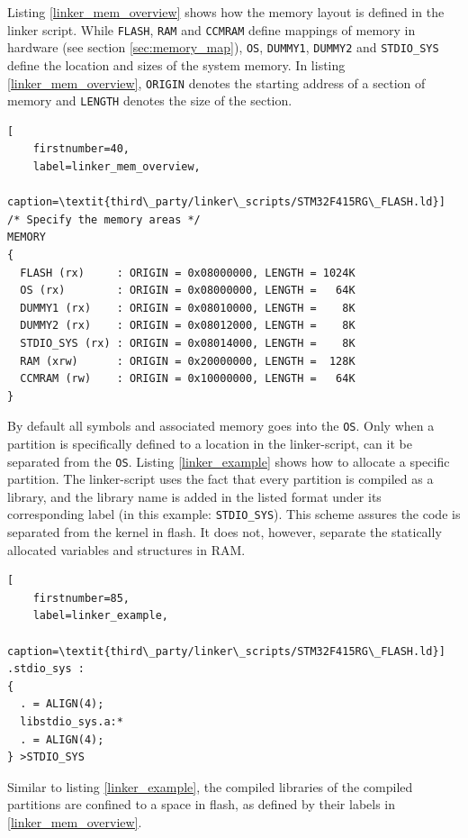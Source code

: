 Listing \ref{linker_mem_overview} shows how the memory layout is defined in the linker script.
While \texttt{FLASH}, \texttt{RAM} and \texttt{CCMRAM} define mappings of memory in hardware (see section \ref{sec:memory_map}),
\texttt{OS}, \texttt{DUMMY1}, \texttt{DUMMY2} and \texttt{STDIO\_SYS} define the location and sizes of the system memory.
In listing \ref{linker_mem_overview}, \texttt{ORIGIN} denotes the starting address of a section of memory
and \texttt{LENGTH} denotes the size of the section.\\

\begin{minipage}{\linewidth}
\begin{lstlisting}[
	firstnumber=40,
	label=linker_mem_overview,
	caption=\textit{third\_party/linker\_scripts/STM32F415RG\_FLASH.ld}]
/* Specify the memory areas */
MEMORY
{
  FLASH (rx)     : ORIGIN = 0x08000000, LENGTH = 1024K
  OS (rx)        : ORIGIN = 0x08000000, LENGTH =   64K
  DUMMY1 (rx)    : ORIGIN = 0x08010000, LENGTH =    8K
  DUMMY2 (rx)    : ORIGIN = 0x08012000, LENGTH =    8K
  STDIO_SYS (rx) : ORIGIN = 0x08014000, LENGTH =    8K
  RAM (xrw)      : ORIGIN = 0x20000000, LENGTH =  128K
  CCMRAM (rw)    : ORIGIN = 0x10000000, LENGTH =   64K
}
\end{lstlisting}
\end{minipage}

By default all symbols and associated memory goes into the \texttt{OS}.
Only when a partition is specifically defined to a location in the linker-script,
can it be separated from the \texttt{OS}.
Listing \ref{linker_example} shows how to allocate a specific partition.
The linker-script uses the fact that every partition is compiled as a library,
and the library name is added in the listed format under its corresponding label
(in this example: \texttt{STDIO\_SYS}).
This scheme assures the code is separated from the kernel in flash.
It does not, however, separate the statically allocated variables and structures in RAM.\\

\begin{minipage}{\linewidth}
\begin{lstlisting}[
	firstnumber=85,
	label=linker_example,
	caption=\textit{third\_party/linker\_scripts/STM32F415RG\_FLASH.ld}]
.stdio_sys :
{
  . = ALIGN(4);
  libstdio_sys.a:*
  . = ALIGN(4);
} >STDIO_SYS
\end{lstlisting}
\end{minipage}

Similar to listing \ref{linker_example},
the compiled libraries of the compiled partitions are confined to a space in flash,
as defined by their labels in \ref{linker_mem_overview}.


